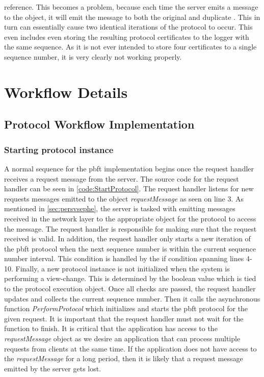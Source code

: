 reference. This becomes a problem, because each time the server emits a message to the  object, it will emit the message to both the original and duplicate . This in turn can essentially cause two identical iterations of the protocol to occur. This even includes even storing the resulting protocol certificates to the logger with the same sequence. As it is not ever intended to store four certificates to a single sequence number, it is very clearly not working properly. 
\fi

\section{Workflow Details}
\label{sec:protocolwork}
\subsection{Protocol Workflow Implementation}

\subsubsection{Starting protocol instance}
A normal sequence for the \ac{pbft} implementation begins once the request handler receives a request message from the server. The source code for the request handler can be seen in \autoref{code:StartProtocol}. The request handler listens for new requests messages emitted to the  object \emph{requestMessage} as seen on line 3. As mentioned in \autoref{sec:persvsephe}, the server is tasked with emitting messages received in the network layer to the appropriate  object for the protocol to access the message. The request handler is responsible for making sure that the request received is valid. In addition, the request handler only starts a new iteration of the \ac{pbft} protocol when the next sequence number is within the current sequence number interval. This condition is handled by the if condition spanning lines 4-10. Finally, a new protocol instance is not initialized when the system is performing a view-change. This is determined by the boolean value  which is tied to the protocol execution object. Once all checks are passed, the request handler updates and collects the current sequence number. Then it calls the asynchronous  function \emph{PerformProtocol} which initializes and starts the \ac{pbft} protocol for the given request. It is important that the request handler must not wait for the  function to finish. It is critical that the application has access to the \emph{requestMessage}  object as we desire an application that can process multiple requests from clients at the same time. If the application does not have access to the \emph{requestMessage} for a long period, then it is likely that a request message emitted by the server gets lost.

